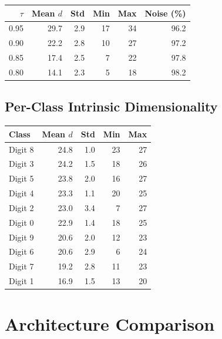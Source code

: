 \documentclass[11pt,letterpaper]{article}
\begin{document}
\begin{tabular}{@{}rrrrrr@{}}
\toprule
$\tau$ & Mean $d$ & Std & Min & Max & Noise (\%) \\
\midrule
  0.95 & 29.7 & 2.9 & 17 & 34 & 96.2 \\
  0.90 & 22.2 & 2.8 & 10 & 27 & 97.2 \\
  0.85 & 17.4 & 2.5 & 7 & 22 & 97.8 \\
  0.80 & 14.1 & 2.3 & 5 & 18 & 98.2 \\
\bottomrule
\end{tabular}

\subsection{Per-Class Intrinsic Dimensionality}

\begin{tabular}{@{}lrrrr@{}}
\toprule
Class & Mean $d$ & Std & Min & Max \\
\midrule
  Digit 8 & 24.8 & 1.0 & 23 & 27 \\
  Digit 3 & 24.2 & 1.5 & 18 & 26 \\
  Digit 5 & 23.8 & 2.0 & 16 & 27 \\
  Digit 4 & 23.3 & 1.1 & 20 & 25 \\
  Digit 2 & 23.0 & 3.4 & 7 & 27 \\
  Digit 0 & 22.9 & 1.4 & 18 & 25 \\
  Digit 9 & 20.6 & 2.0 & 12 & 23 \\
  Digit 6 & 20.6 & 2.9 & 6 & 24 \\
  Digit 7 & 19.2 & 2.8 & 11 & 23 \\
  Digit 1 & 16.9 & 1.5 & 13 & 20 \\
\bottomrule
\end{tabular}

\section{Architecture Comparison}
\end{document}
